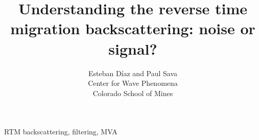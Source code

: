 

\author{Esteban D\'{i}az and Paul Sava\\ 
Center for Wave Phenomena \\ 
Colorado School of Mines}
\title{Understanding the reverse time migration backscattering: noise or signal?}
\maketitle


\begin{keywords}
RTM backscattering, filtering, MVA
\end{keywords}








